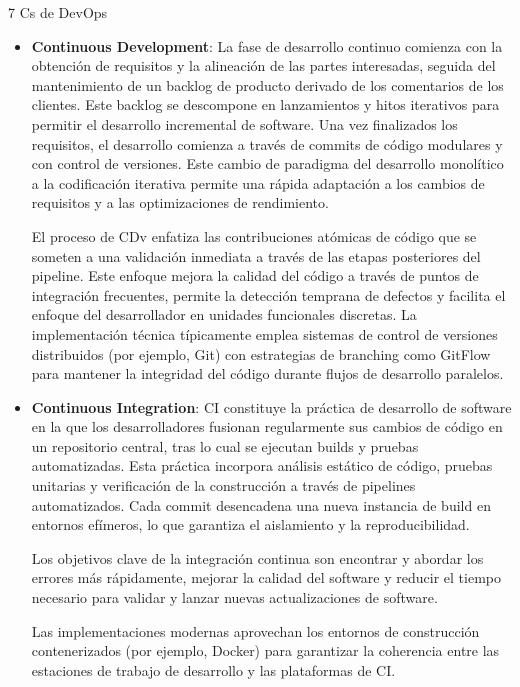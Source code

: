 \documentclass[12pt]{book}
\begin{document}
7 Cs de DevOps

\begin{itemize}
    \item \textbf{Continuous Development}:
    La fase de desarrollo continuo comienza con la obtención de requisitos y la alineación de las partes interesadas, seguida del mantenimiento de un backlog de producto derivado de los comentarios de los clientes. Este backlog se descompone en lanzamientos y hitos iterativos para permitir el desarrollo incremental de software. Una vez finalizados los requisitos, el desarrollo comienza a través de commits de código modulares y con control de versiones. Este cambio de paradigma del desarrollo monolítico a la codificación iterativa permite una rápida adaptación a los cambios de requisitos y a las optimizaciones de rendimiento.

    El proceso de CDv enfatiza las contribuciones atómicas de código que se someten a una validación inmediata a través de las etapas posteriores del pipeline. Este enfoque mejora la calidad del código a través de puntos de integración frecuentes, permite la detección temprana de defectos y facilita el enfoque del desarrollador en unidades funcionales discretas. La implementación técnica típicamente emplea sistemas de control de versiones distribuidos (por ejemplo, Git) con estrategias de branching como GitFlow para mantener la integridad del código durante flujos de desarrollo paralelos.

    \item \textbf{Continuous Integration}:
    CI constituye la práctica de desarrollo de software en la que los desarrolladores fusionan regularmente sus cambios de código en un repositorio central, tras lo cual se ejecutan builds y pruebas automatizadas. Esta práctica incorpora análisis estático de código, pruebas unitarias y verificación de la construcción a través de pipelines automatizados. Cada commit desencadena una nueva instancia de build en entornos efímeros, lo que garantiza el aislamiento y la reproducibilidad.

    Los objetivos clave de la integración continua son encontrar y abordar los errores más rápidamente, mejorar la calidad del software y reducir el tiempo necesario para validar y lanzar nuevas actualizaciones de software.

    Las implementaciones modernas aprovechan los entornos de construcción contenerizados (por ejemplo, Docker) para garantizar la coherencia entre las estaciones de trabajo de desarrollo y las plataformas de CI.


\end{itemize}
\end{document}
